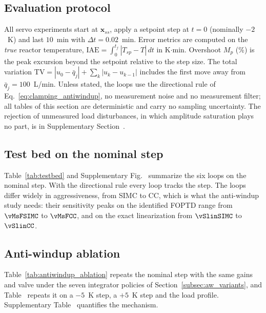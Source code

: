 
\subsection{Evaluation protocol}
\label{subsec:protocol}
All servo experiments start at $\mathbf{x}_{ss}$, apply a setpoint step at $t = 0$ (nominally $-2$~K) and last $10$~min with $\Delta t = 0.02$~min. Error metrics are computed on the \emph{true} reactor temperature, $\mathrm{IAE} = \int_0^{t_f}|T_{sp} - T|\,dt$ in K$\cdot$min. Overshoot $M_p$ (\%) is the peak excursion beyond the setpoint relative to the step size. The total variation $\mathrm{TV} = |u_0 - \bar q_j| + \sum_k |u_k - u_{k-1}|$ includes the first move away from $\bar q_j = 100$~L/min. Unless stated, the loops use the directional rule of Eq.~\eqref{eq:clamping_antiwindup}, no measurement noise and no measurement filter; all tables of this section are deterministic and carry no sampling uncertainty. The rejection of unmeasured load disturbances, in which amplitude saturation plays no part, is in Supplementary Section~.

\subsection{Test bed on the nominal step}
Table~\ref{tab:testbed} and Supplementary Fig.~ summarize the six loops on the nominal step. With the directional rule every loop tracks the step. The loops differ widely in aggressiveness, from SIMC to CC, which is what the anti-windup study needs: their sensitivity peaks on the identified FOPTD range from $\vMsFSIMC$ to $\vMsFCC$, and on the exact linearization from $\vSlinSIMC$ to $\vSlinCC$.





\subsection{Anti-windup ablation}
\label{subsec:ablation}
Table~\ref{tab:antiwindup_ablation} repeats the nominal step with the same gains and valve under the seven integrator policies of Section~\ref{subsec:aw_variants}, and Table~ repeats it on a $-5$~K step, a $+5$~K step and the load profile. Supplementary Table~ quantifies the mechanism.

